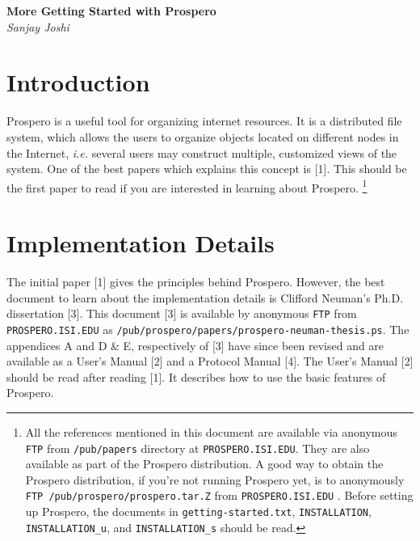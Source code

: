

\begin{center}
{\Large {\bf More Getting Started with Prospero\\}}
{\it Sanjay Joshi}
\end{center}

\begin {abstract}
	This document  is intended as a guide to the Prospero documentation , for those interested in knowing more about Prospero. It presents a brief survey of the literature on Prospero and briefly describes the organization of Prospero.
\end{abstract}

\section* {Introduction}

	Prospero is a useful tool for organizing internet resources. It is a distributed file system, which allows the users to organize objects located on different nodes in the Internet, {\em i.e.} several users may construct multiple, customized views of the system. One of the best papers which explains this concept is [1]. This should be the first paper to  read if you are interested in learning about Prospero.
\footnote {All the references mentioned in this document are available via anonymous {\tt FTP} from {\tt /pub/papers} directory at  {\tt PROSPERO.ISI.EDU}. They are also available as part of the Prospero distribution. A good way to obtain the Prospero distribution, if you're not running Prospero yet, is to anonymously {\tt FTP /pub/prospero/prospero.tar.Z} from {\tt PROSPERO.ISI.EDU} .  Before setting up Prospero, the documents in {\tt getting-started.txt}, {\tt INSTALLATION}, {\tt INSTALLATION\_u}, and {\tt INSTALLATION\_s} should be read.}

\section* {Implementation Details}

	The initial paper [1] gives the principles behind Prospero. However, the best document  to learn about the implementation details is Clifford Neuman's Ph.D. dissertation [3]. This document [3] is available by anonymous {\tt FTP} from {\tt PROSPERO.ISI.EDU} as {\tt /pub/prospero/papers/prospero-neuman-thesis.ps}. The appendices A and D \& E, respectively of [3] have since been revised and are available as a 
User's Manual [2] and a Protocol Manual [4]. The User's Manual [2] should be read after reading [1]. It describes how to use the basic features of Prospero. \\

